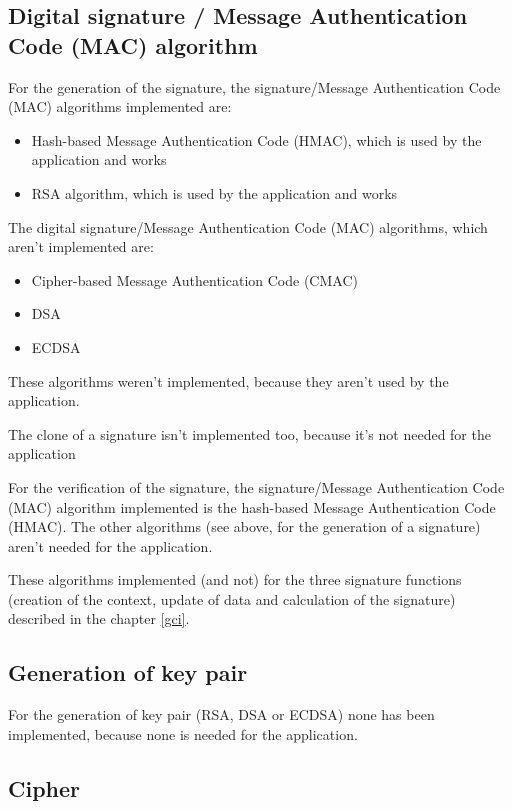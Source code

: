 \subsection*{Digital signature / Message Authentication Code (MAC) algorithm}

For the generation of the signature, the signature/Message Authentication Code
(MAC) algorithms implemented are:
\begin{itemize}[noitemsep]
  \item Hash-based Message Authentication Code (HMAC), which is used
  by the \embtls application and works
  \item RSA algorithm, which is used by the \embtls application and works
\end{itemize}


The digital signature/Message Authentication Code (MAC) algorithms, which aren't
implemented are:
\begin{itemize}[noitemsep]
  \item Cipher-based Message Authentication Code (CMAC)
  \item DSA
  \item ECDSA
\end{itemize}

These algorithms weren't implemented, because they aren't used by the \embtls
application.

The clone of a signature isn't implemented too, because it's not needed for the
\embtls application


For the verification of the signature, the signature/Message Authentication Code
(MAC) algorithm implemented is the hash-based Message Authentication Code
(HMAC).
The other algorithms (see above, for the generation of a signature) aren't
needed for the \embtls application.

These algorithms implemented (and not) for the three signature functions
(creation of the context, update of data and calculation of the signature)
described in the chapter \ref{gci}.

\subsection*{Generation of key pair}

For the generation of key pair (RSA, DSA or ECDSA) none has been implemented,
because none is needed for the \embtls application.

\subsection*{Cipher}

